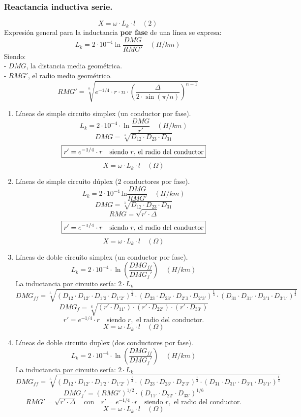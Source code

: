 \documentclass[12pt,a4paper]{article}
\begin{document}
\subsubsection{Reactancia inductiva serie.}
\[
\boxed{X = \omega \cdot L_k \cdot l \quad (2)}
\]
Expresión general para la inductancia \textbf{por fase} de una línea se expresa:
\[
\boxed{L_k = 2 \cdot 10^{-4} \ln \frac{DMG}{RMG'} \quad (H / km)}
\]
Siendo:\\
- \( DMG \), la distancia media geométrica.\\
- \( RMG' \), el radio medio geométrico.
\[ 
\boxed{RMG' = \sqrt[n]{e^{-1/4} \cdot r \cdot n \cdot \left( \frac{\Delta}{2 \cdot \sin(\pi / n)} \right)^{n-1}}}
\]
\begin{enumerate}
	\item Líneas de simple circuito simplex (un conductor por fase).
	\[
	\boxed{	L_k = 2 \cdot 10^{-4} \cdot \ln \frac{DMG}{r'} \quad (H/km)}
	\]
	\[
	\boxed{DMG = \sqrt[3]{D_{12} \cdot D_{23} \cdot D_{31}}}
	\]
	\[
	\boxed{r' = e^{-1/4} \cdot r \quad \text{siendo \( r \), el radio del conductor}}
	\]
	\[
	\boxed{X = \omega \cdot L_k \cdot l \quad (\Omega)}
	\]
	\item Líneas de simple circuito dúplex (2 conductores por fase).
	\[
	\boxed{	L_k = 2 \cdot 10^{-4} \, \text{ln} \frac{DMG}{RMG'} \quad (H / km)}
	\]
	\[
	\boxed{	DMG = \sqrt[3]{D_{12} \cdot D_{23} \cdot D_{31}}}
	\]
	\[
	\boxed{	RMG = \sqrt{r' \cdot \Delta}}
	\]
	\[
	\boxed{r' = e^{-1/4} \cdot r \quad \text{siendo \( r \), el radio del conductor}}
	\]
	\[
	\boxed{	X = \omega \cdot L_k \cdot l \quad (\Omega)}
	\]
	\item Líneas de doble circuito simplex (un conductor por fase).
	\[
	\boxed{	L_k = 2 \cdot 10^{-4} \cdot \ln \left(\frac{DMG_{ff}}{DMG_f'}\right) \quad (H/km)}
	\]
	La inductancia por circuito sería: $\boxed{2 \cdot L_k}$ 
	\[
	\boxed{DMG_{ff} = \sqrt[3]{(D_{12}\cdot D_{12'}\cdot D_{1'2}\cdot D_{1'2'})^\frac{1}{4} \cdot (D_{23}\cdot D_{23'}\cdot D_{2'3}\cdot D_{2'3'})^\frac{1}{4} \cdot (D_{31}\cdot D_{31'}\cdot D_{3'1}\cdot D_{3'1'})^\frac{1}{4}}} 
	\]
	\[
	\boxed{DMG_f = \sqrt[6]{\left( r' \cdot D_{11'} \right) \cdot \left( r' \cdot D_{22'} \right) \cdot \left( r' \cdot D_{33'} \right)}}
	\]
	\[
	\boxed{	r' = e^{-1/4} \cdot r \quad \text{siendo } r, \text{ el radio del conductor.}}
	\]
	\[
	\boxed{	X = \omega \cdot L_k \cdot l \quad (\Omega)}
	\]
	\item Líneas de doble circuito duplex (dos conductores por fase).
	\[
	\boxed{	L_k = 2 \cdot 10^{-4} \cdot \ln \left(\frac{DMG_{ff}}{DMG_f'}\right) \quad (H/km)}
	\]
	La inductancia por circuito sería: $\boxed{2 \cdot L_k}$ 	
	\[
	\boxed{DMG_{ff} = \sqrt[3]{(D_{12}\cdot D_{12'}\cdot D_{1'2}\cdot D_{1'2'})^\frac{1}{4} \cdot (D_{23}\cdot D_{23'}\cdot D_{2'3'})^\frac{1}{4} \cdot (D_{31}\cdot D_{31'}\cdot D_{3'1}\cdot D_{3'1'})^\frac{1}{4}}} 
	\]
	\[
	\boxed{	DMG_f' = \left(RMG'\right)^{1/2} \cdot \left(D_{11'} \cdot D_{22'} \cdot D_{33'}\right)^{1/6}}
	\]
	\[
	\boxed{	RMG' = \sqrt{r'\cdot \Delta}  \quad \text{con} \quad r' = e^{-1/4} \cdot r \quad \text{siendo } r, \text{ el radio del conductor.}}
	\]
	\[
	\boxed{	X = \omega \cdot L_k \cdot l \quad (\Omega)}
	\]
\end{enumerate}
\end{document}
